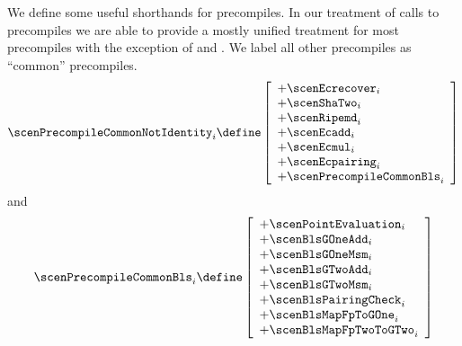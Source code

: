 We define some useful shorthands for precompiles.
In our treatment of calls to precompiles we are able to provide a mostly unified treatment for most precompiles with the exception of \instModexp{} and \instBlake{}.
We label all other precompiles as ``common'' precompiles.
\[
	\scenPrecompileCommonNotIdentity _{i}
	\define
	\left[ \begin{array}{l}
		+ \scenEcrecover       _{i} \\
		+ \scenShaTwo          _{i} \\
		+ \scenRipemd          _{i} \\
		+ \scenEcadd           _{i} \\
		+ \scenEcmul           _{i} \\
		+ \scenEcpairing       _{i} \\
		+ \scenPrecompileCommonBls _{i} \\
	\end{array} \right]
\]
and
\[
	\scenPrecompileCommonBls _{i}
	\define
	\left[ \begin{array}{l}
		+ \scenPointEvaluation    _{i} \\
		+ \scenBlsGOneAdd         _{i} \\
		+ \scenBlsGOneMsm         _{i} \\
		+ \scenBlsGTwoAdd         _{i} \\
		+ \scenBlsGTwoMsm         _{i} \\
		+ \scenBlsPairingCheck    _{i} \\
		+ \scenBlsMapFpToGOne     _{i} \\
		+ \scenBlsMapFpTwoToGTwo  _{i} \\
	\end{array} \right]
\]
